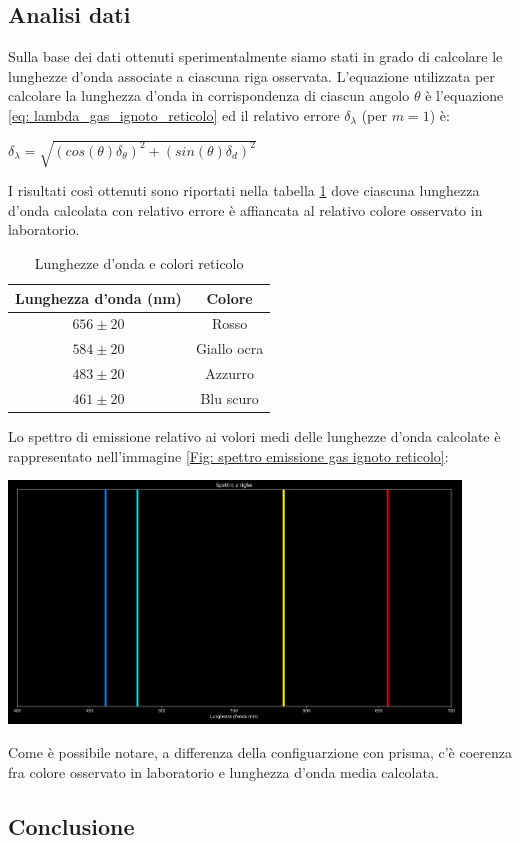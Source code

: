 \documentclass[a4paper]{article}
\begin{document}
\subsection{Analisi dati}
Sulla base dei dati ottenuti sperimentalmente siamo stati in grado di calcolare le lunghezze d'onda associate a ciascuna riga osservata. L'equazione utilizzata per calcolare la lunghezza d'onda in corrispondenza di ciascun angolo $\theta$ è l'equazione \ref{eq: lambda_gas_ignoto_reticolo} ed il relativo errore $\delta_\lambda$ (per $m=1$) è:
\begin{center}
$\delta_\lambda=\sqrt{(cos(\theta)\delta_\theta)^2+(sin(\theta)\delta_d)^2}$
\end{center}
I risultati così ottenuti sono riportati nella tabella \ref{tab: tabella lunghezze d'onda reticolo} dove ciascuna lunghezza d'onda calcolata con relativo errore è affiancata al relativo colore osservato in laboratorio.
\begin{table}[h!]
\centering
\begin{tabular}{|c|c|}
\hline
\textbf{Lunghezza d'onda (nm)} & \textbf{Colore} \\
\hline
$656 \pm 20$ & Rosso  \\
$584 \pm 20$ & Giallo ocra\\
$483 \pm 20$ & Azzurro \\
$461 \pm 20$ & Blu scuro \\
\hline
\end{tabular}
\caption{Lunghezze d'onda e colori reticolo}
\label{tab: tabella lunghezze d'onda reticolo}
\end{table}
Lo spettro di emissione relativo ai volori medi delle lunghezze d'onda calcolate è rappresentato nell'immagine \ref{Fig: spettro emissione gas ignoto reticolo}:
\begin{center}
	\includegraphics[width=0.9\textwidth]{grafici/spettro gas ignoto reticolo 300.png}
\label{Fig: spettro emissione gas ignoto reticolo}
\end{center}
Come è possibile notare, a differenza della configuarzione con prisma, c'è coerenza fra colore osservato in laboratorio e lunghezza d'onda media calcolata.

\subsection{Conclusione}
\end{document}
